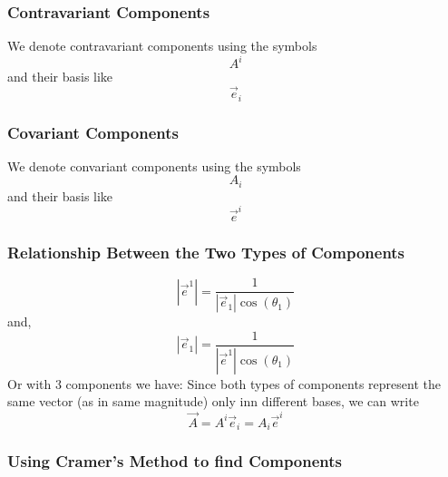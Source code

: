 \subsubsection{Contravariant Components}
We denote contravariant components using the symbols
$$A^i$$
and their basis like
$$\overrightarrow{e}_i$$
\subsubsection{Covariant Components}
We denote convariant components using the symbols
$$A_i$$
and their basis like
$${\overrightarrow{e}}^i$$
\subsubsection{Relationship Between the Two Types of Components}

$$|\overrightarrow{e}^1| = \frac{1}{|\overrightarrow{e}_1|\cos(\theta_1)}$$
and,
$$|\overrightarrow{e}_1| = \frac{1}{|\overrightarrow{e}^1|\cos(\theta_1)}$$
Or with 3 components we have:
Since both types of components represent the same vector (as in same magnitude) only inn  different bases, we can write
$$\overrightarrow{A} = A^{i}\overrightarrow{e}_i = A_{i}\overrightarrow{e}^i$$
\subsubsection{Using Cramer's Method to find Components}

